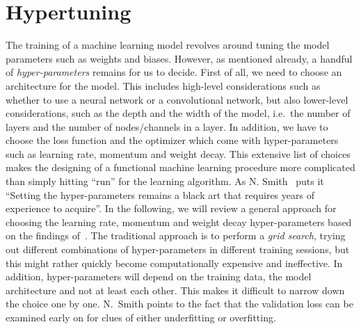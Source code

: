 \section{Hypertuning}\label{sec:hypertuning}
The training of a machine learning model revolves around tuning the model parameters such as weights and biases. However, as mentioned already, a handful of \textit{hyper-parameters} remains for us to decide. First of all, we need to choose an architecture for the model. This includes high-level considerations such as whether to use a neural network or a convolutional network, but also lower-level considerations, such as the depth and the width of the model, i.e.\ the number of layers and the number of nodes/channels in a layer. In addition, we have to choose the loss function and the optimizer which come with hyper-parameters such as learning rate, momentum and weight decay. This extensive list of choices makes the designing of a functional machine learning procedure more complicated than simply hitting ``run'' for the learning algorithm. As N. Smith~\cite{smith2018disciplined} puts it ``Setting the
hyper-parameters remains a black art that requires years of experience to
acquire''. In the following, we will review a general approach for choosing the learning rate, momentum and weight decay hyper-parameters based on the findings of~\cite{smith2018disciplined}. The traditional approach is to
perform a \textit{grid search}, trying out different combinations of hyper-parameters in different training sessions, but this might rather quickly become computationally expensive and ineffective. In addition, hyper-parameters will depend on the training data, the model architecture and not at least each other. This makes it difficult to narrow down the choice one by one. N.\ Smith points to the fact that the validation loss can be examined early on for
clues of either underfitting or overfitting. 

